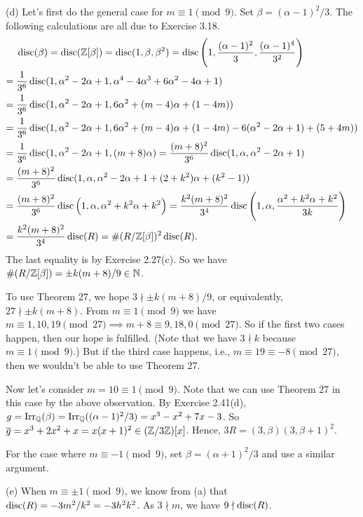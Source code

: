 \documentclass[../Marcus.tex]{subfiles}
\begin{document}
(d) Let's first do the general case for $m\equiv 1 \pmod{9}$. Set $\beta=(\alpha-1)^2/3$. The following calculations are all due to Exercise 3.18.
\begin{align*}
    &\operatorname{disc}(\beta) = \operatorname{disc}(\mathbb{Z}[\beta]) = \operatorname{disc}(1,\beta,\beta^2) = \operatorname{disc}\left(1,\frac{(\alpha-1)^2}{3},\frac{(\alpha-1)^4}{3^2}\right) \\ ={} &\frac{1}{3^6}\operatorname{disc}(1,\alpha^2-2\alpha+1,\alpha^4-4\alpha^3+6\alpha^2-4\alpha+1) \\ ={} &\frac{1}{3^6}\operatorname{disc}(1,\alpha^2-2\alpha+1,6\alpha^2+(m-4)\alpha+(1-4m)) \\ ={} &\frac{1}{3^6}\operatorname{disc}(1,\alpha^2-2\alpha+1,6\alpha^2+(m-4)\alpha+(1-4m)-6(\alpha^2-2\alpha+1)+(5+4m)) \\ ={} &\frac{1}{3^6}\operatorname{disc}(1,\alpha^2-2\alpha+1,(m+8)\alpha) = \frac{(m+8)^2}{3^6}\operatorname{disc}(1,\alpha,\alpha^2-2\alpha+1) \\ ={} &\frac{(m+8)^2}{3^6}\operatorname{disc}(1,\alpha,\alpha^2-2\alpha+1+(2+k^2)\alpha+(k^2-1)) \\ ={} &\frac{(m+8)^2}{3^6}\operatorname{disc}\left(1,\alpha,\alpha^2+k^2\alpha+k^2\right) = \frac{k^2(m+8)^2}{3^4}\operatorname{disc}\left(1,\alpha,\frac{\alpha^2+k^2\alpha+k^2}{3k}\right) \\ ={} &\frac{k^2(m+8)^2}{3^4}\operatorname{disc}(R) = \#(R/\mathbb{Z}[\beta])^2\operatorname{disc}(R).
\end{align*}
The last equality is by Exercise 2.27(c). So we have $\#(R/\mathbb{Z}[\beta])=\pm k(m+8)/9\in\mathbb{N}$.

To use Theorem 27, we hope $3\nmid \pm k(m+8)/9$, or equivalently, $27\nmid \pm k(m+8)$. From $m\equiv 1 \pmod{9}$ we have $m\equiv 1,10,19 \pmod{27} \implies m+8\equiv 9,18,0 \pmod{27}$. So if the first two cases happen, then our hope is fulfilled. (Note that we have $3\nmid k$ because $m\equiv 1 \pmod{9}$.) But if the third case happens, i.e., $m\equiv 19\equiv -8 \pmod{27}$, then we wouldn't be able to use Theorem 27.

Now let's consider $m=10\equiv 1\pmod{9}$. Note that we can use Theorem 27 in this case by the above observation. By Exercise 2.41(d), $g=\operatorname{Irr}_{\mathbb{Q}}(\beta)=\operatorname{Irr}_{\mathbb{Q}}((\alpha-1)^2/3)=x^3-x^2+7x-3$. So $\overline{g}=x^3+2x^2+x=x(x+1)^2\in(\mathbb{Z}/3\mathbb{Z})[x]$. Hence, $3R=(3,\beta)(3,\beta+1)^2$.

For the case where $m\equiv -1\pmod{9}$, set $\beta=(\alpha+1)^2/3$ and use a similar argument.

(e) When $m\equiv \pm1\pmod{9}$, we know from (a) that $\operatorname{disc}(R) = -3m^2/k^2 = -3h^2k^2$. As $3\nmid m$, we have $9 \nmid \operatorname{disc}(R)$.
\end{document}
